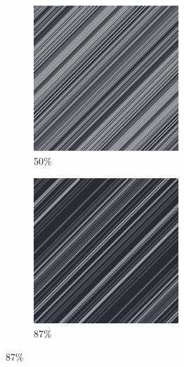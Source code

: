 \documentclass[12pt, fleqn]{report}                             %
\theoremstyle{break}                                            %
\begin{document}
\begin{figure}[ht!]
\begin{subfigure}[b]{0.4\linewidth}
          \includegraphics[width=0.6\textwidth]{Images/74/c.png}
          \caption{50\%}
        \end{subfigure}
        \begin{subfigure}[b]{0.4\linewidth}
          \includegraphics[width=0.6\textwidth]{Images/74/d.png}
          \caption{87\%}
        \end{subfigure}
      \end{figure}
\end{document}
